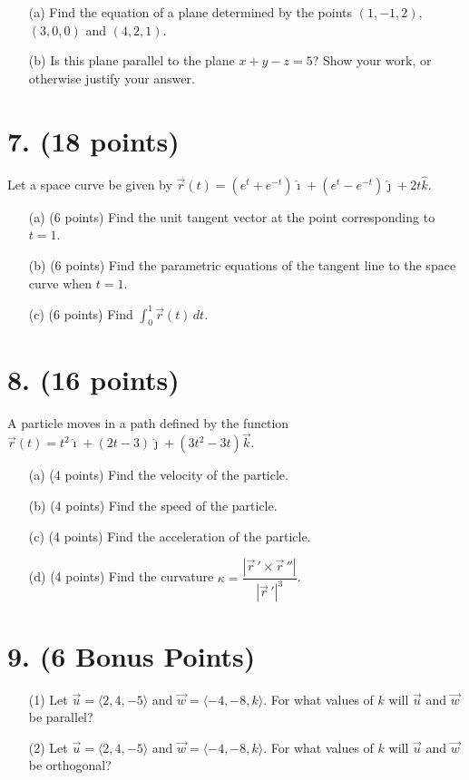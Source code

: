 \documentclass[12pt]{article}
\begin{document}
\begin{itemize}
    \item[(a)] Find the equation of a plane determined by the points $(1, -1, 2)$, $(3, 0, 0)$ and $(4, 2, 1)$.
    \item[(b)] Is this plane parallel to the plane $x + y - z = 5$? Show your work, or otherwise justify your answer.
\end{itemize}

\newpage

\section*{7. (18 points)}

Let a space curve be given by $\vec{r}(t) = (e^t + e^{-t})\hat{\imath} + (e^t - e^{-t})\hat{\jmath} + 2t\hat{k}$.

\begin{itemize}
    \item[(a)] (6 points) Find the unit tangent vector at the point corresponding to $t = 1$.
    \item[(b)] (6 points) Find the parametric equations of the tangent line to the space curve when $t = 1$.
    \item[(c)] (6 points) Find $\displaystyle \int_0^1 \vec{r}(t)\, dt$.
\end{itemize}

\newpage

\section*{8. (16 points)}

A particle moves in a path defined by the function $\vec{r}(t) = t^2 \hat{\imath} + (2t - 3) \hat{\jmath} + (3t^2 - 3t) \vec{k}$.

\begin{itemize}
    \item[(a)] (4 points) Find the velocity of the particle.
    \item[(b)] (4 points) Find the speed of the particle.
    \item[(c)] (4 points) Find the acceleration of the particle.
    \item[(d)] (4 points) Find the curvature $\kappa = \dfrac{|\vec{r}\,' \times \vec{r}\,''|}{|\vec{r}\,'|^3}$.
\end{itemize}

\newpage

\section*{9. (6 Bonus Points)}

\begin{itemize}
    \item[(1)] Let $\vec{u} = \langle 2, 4, -5 \rangle$ and $\vec{w} = \langle -4, -8, k \rangle$. For what values of $k$ will $\vec{u}$ and $\vec{w}$ be parallel?
    \item[(2)] Let $\vec{u} = \langle 2, 4, -5 \rangle$ and $\vec{w} = \langle -4, -8, k \rangle$. For what values of $k$ will $\vec{u}$ and $\vec{w}$ be orthogonal?
\end{itemize}
\end{document}
